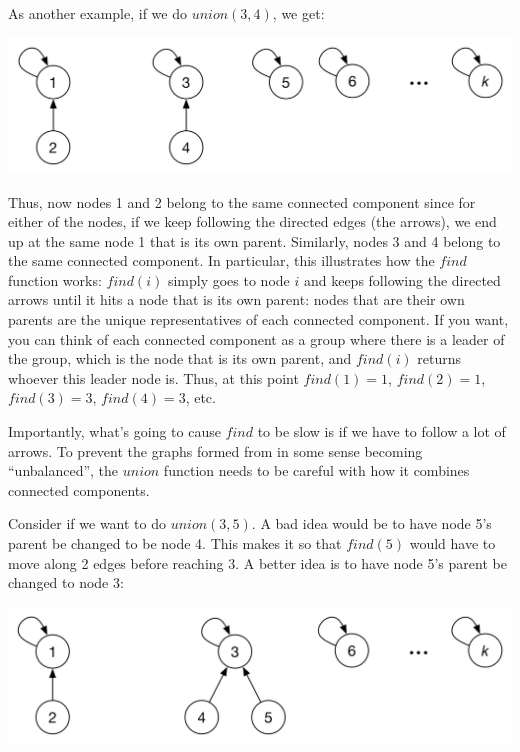 As another example, if we do $union(3,4)$, we get:

{\centering\includegraphics[scale=0.4]{images_union-find3} \par}

Thus, now nodes 1 and 2 belong to the same connected component since for either of the nodes, if we keep following the directed edges (the arrows), we end up at the same node 1 that is its own parent. Similarly, nodes 3 and 4 belong to the same connected component. In particular, this illustrates how the $find$ function works: $find(i)$ simply goes to node $i$ and keeps following the directed arrows until it hits a node that is its own parent: nodes that are their own parents are the unique representatives of each connected component. If you want, you can think of each connected component as a group where there is a leader of the group, which is the node that is its own parent, and $find(i)$ returns whoever this leader node is. Thus, at this point $find(1)=1$, $find(2)=1$, $find(3)=3$, $find(4)=3$, etc.

Importantly, what's going to cause $find$ to be slow is if we have to follow a lot of arrows. To prevent the graphs formed from in some sense becoming ``unbalanced'', the $union$ function needs to be careful with how it combines connected components.

Consider if we want to do $union(3,5)$. A bad idea would be to have node 5's parent be changed to be node 4. This makes it so that $find(5)$ would have to move along 2 edges before reaching 3. A better idea is to have node 5's parent be changed to node 3:

{\centering\includegraphics[scale=0.4]{images_union-find4} \par}

